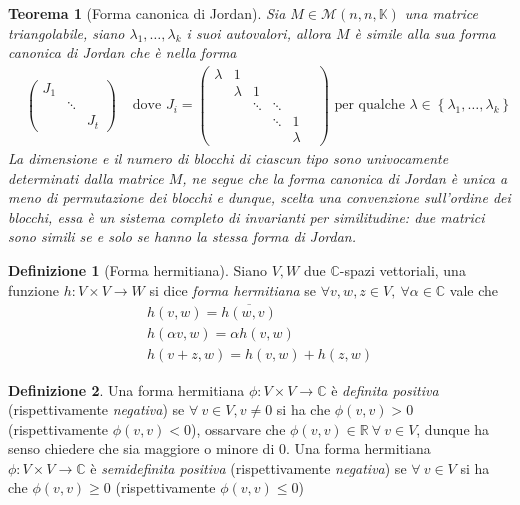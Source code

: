 \documentclass[11pt]{article}
\theoremstyle{plain}
\newtheorem{thm}{Teorema}[section]
\theoremstyle{definition}
\newtheorem{defn}{Definizione}[section]
\theoremstyle{remark}
\newcommand{\C}{\mathbb{C}}
\newcommand{\R}{\mathbb{R}}
\newcommand{\K}{\mathbb{K}}
\begin{document}
\begin{thm}[Forma canonica di Jordan]
	Sia $M\in \mathcal{M}(n,n,\K)$ una matrice triangolabile, siano $\lambda_1,\ldots,\lambda_k$ i suoi autovalori, allora $M$ è simile alla sua \textit{forma canonica di Jordan} che è nella forma
	\begin{align*}
		&\begin{pmatrix}
			J_1 & & \\
			& \ddots & \\
			& & J_t
		\end{pmatrix}		
		&\text{ dove }J_i=\begin{pmatrix}
		                  	\lambda & 1 & & & \\
							& \lambda & 1 & & \\
		                  	& & \ddots & \ddots & \\
		                  	& & & \ddots & 1 & \\
		                  	& & & & \lambda
		                  \end{pmatrix} \text{ per qualche }\lambda \in \left\{ \lambda_1,\ldots,\lambda_k \right\}
	\end{align*}
	La dimensione e il numero di blocchi di ciascun tipo sono univocamente determinati dalla matrice $M$, ne segue che la forma canonica di Jordan è unica a meno di permutazione dei blocchi e dunque, scelta una convenzione sull'ordine dei blocchi, essa è un sistema completo di invarianti per similitudine: due matrici sono simili se e solo se hanno la stessa forma di Jordan.

\end{thm}
\begin{defn}[Forma hermitiana]
Siano $V,W$ due $\C$-spazi vettoriali, una funzione $h:V\times V\to W$ si dice \textit{forma hermitiana} se $\forall v,w,z\in V,\ \forall \alpha \in \C$ vale che
\begin{gather*}
	h(v,w) = \overline{h(w,v)}\\
	h(\alpha v, w) = \alpha h(v,w)\\
	h(v+z,w)=h(v,w)+h(z,w)
\end{gather*}
\end{defn}

\begin{defn}
	Una forma hermitiana $\phi:V\times V\to \C$ è \textit{definita positiva} (rispettivamente \textit{negativa}) se $\forall\ v\in V, v\neq 0$ si ha che $\phi(v,v)>0$ (rispettivamente $\phi(v,v)<0$), ossarvare che $\phi(v,v)\in \R\ \forall\ v\in V$, dunque ha senso chiedere che sia maggiore o minore di $0$.\newline
	Una forma hermitiana $\phi:V\times V\to \C$ è \textit{semidefinita positiva} (rispettivamente \textit{negativa}) se $\forall\ v\in V$ si ha che $\phi(v,v)\geq 0$ (rispettivamente $\phi(v,v)\leq 0$)
\end{defn}
\end{document}
